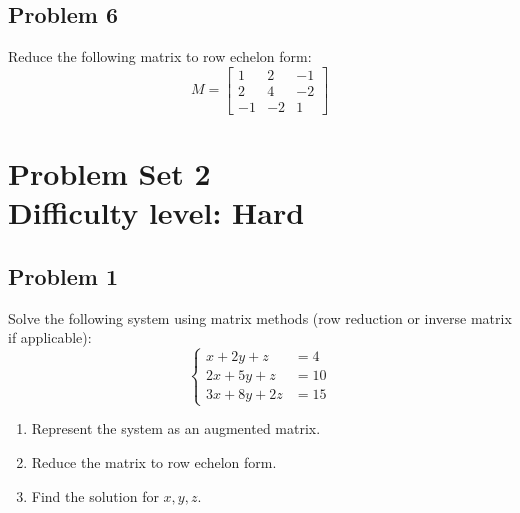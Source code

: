 \documentclass[12pt]{article}
\begin{document}
\subsection*{Problem 6}
Reduce the following matrix to row echelon form:
\[
M = \begin{bmatrix}
1 & 2 & -1 \\
2 & 4 & -2 \\
-1 & -2 & 1
\end{bmatrix}
\]

\section*{Problem Set 2\\Difficulty level: Hard}
\subsection*{Problem 1}
Solve the following system using matrix methods (row reduction or inverse matrix if applicable):
\[
\left\{
\begin{aligned}
x + 2y + z &= 4 \\
2x + 5y + z &= 10 \\
3x + 8y + 2z &= 15
\end{aligned}
\right.
\]

\begin{enumerate}[label=\alph*.]
    \item Represent the system as an augmented matrix.
    \item Reduce the matrix to row echelon form.
    \item Find the solution for \( x, y, z \).
\end{enumerate}
\end{document}
